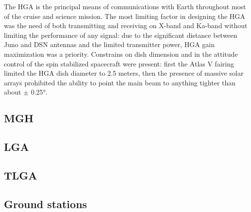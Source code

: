 The HGA is the principal means of communications with Earth throughout most of the cruise and science mission. The most limiting factor in designing the HGA was the need of both transmitting and receiving on X-band and Ka-band without limiting the performance of any signal: due to the significant distance between Juno and DSN antennas and the limited transmitter power, HGA gain maximization was a priority. Constrains on dish dimension and in the attitude control of the spin stabilized spacecraft were present: first the Atlas V fairing limited the HGA dish diameter to 2.5 meters, then the presence of massive solar arrays prohibited the ability to point the main beam to anything tighter than about $\pm$ 0.25°.



\subsection{MGH}

\subsection{LGA}

\subsection{TLGA}

\subsection{Ground stations}


